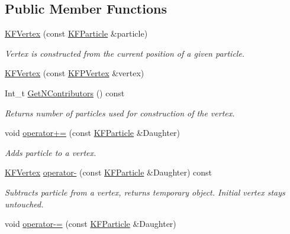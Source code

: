 \subsection*{Public Member Functions}
\begin{DoxyCompactItemize}
\item 
\hyperlink{classKFVertex_ab591c46e3f20b9f4c1d39207d7127e59}{K\+F\+Vertex} (const \hyperlink{classKFParticle}{K\+F\+Particle} \&particle)\hypertarget{classKFVertex_ab591c46e3f20b9f4c1d39207d7127e59}{}\label{classKFVertex_ab591c46e3f20b9f4c1d39207d7127e59}

\begin{DoxyCompactList}\small\item\em Vertex is constructed from the current position of a given particle. \end{DoxyCompactList}\item 
\hyperlink{classKFVertex_add291171f94e133f9a197659d395eb7b}{K\+F\+Vertex} (const \hyperlink{classKFPVertex}{K\+F\+P\+Vertex} \&vertex)
\item 
Int\+\_\+t \hyperlink{classKFVertex_a0a51761dbb09cf89357b1a19cf2df139}{Get\+N\+Contributors} () const \hypertarget{classKFVertex_a0a51761dbb09cf89357b1a19cf2df139}{}\label{classKFVertex_a0a51761dbb09cf89357b1a19cf2df139}

\begin{DoxyCompactList}\small\item\em Returns number of particles used for construction of the vertex. \end{DoxyCompactList}\item 
void \hyperlink{classKFVertex_a33c09d3c2321086ff9564199425d0918}{operator+=} (const \hyperlink{classKFParticle}{K\+F\+Particle} \&Daughter)\hypertarget{classKFVertex_a33c09d3c2321086ff9564199425d0918}{}\label{classKFVertex_a33c09d3c2321086ff9564199425d0918}

\begin{DoxyCompactList}\small\item\em Adds particle to a vertex. \end{DoxyCompactList}\item 
\hyperlink{classKFVertex}{K\+F\+Vertex} \hyperlink{classKFVertex_aa7bf314d94f6d9b5ba7a734bd0e7db1c}{operator-\/} (const \hyperlink{classKFParticle}{K\+F\+Particle} \&Daughter) const \hypertarget{classKFVertex_aa7bf314d94f6d9b5ba7a734bd0e7db1c}{}\label{classKFVertex_aa7bf314d94f6d9b5ba7a734bd0e7db1c}

\begin{DoxyCompactList}\small\item\em Subtracts particle from a vertex, returns temporary object. Initial vertex stays untouched. \end{DoxyCompactList}\item 
void \hyperlink{classKFVertex_aa196e7fe7d77847e7684e26d158bc16c}{operator-\/=} (const \hyperlink{classKFParticle}{K\+F\+Particle} \&Daughter)\hypertarget{classKFVertex_aa196e7fe7d77847e7684e26d158bc16c}{}\label{classKFVertex_aa196e7fe7d77847e7684e26d158bc16c}


\end{DoxyCompactItemize}
